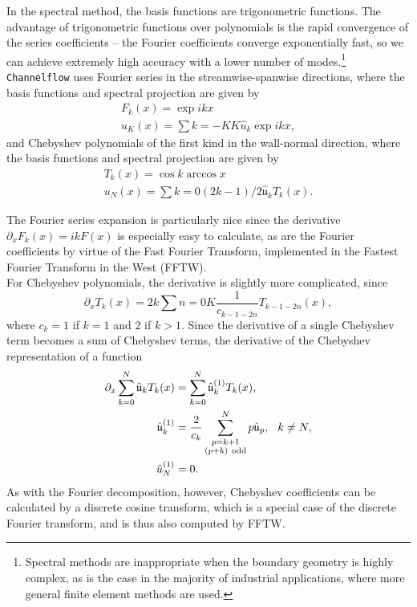 In the spectral method, the basis functions are trigonometric functions. The advantage of trigonometric functions over polynomials is the rapid convergence of the series coefficients -- the Fourier coefficients converge exponentially fast, so we can achieve extremely high accuracy with a lower number of modes.\footnote{Spectral methods are inappropriate when the boundary geometry is highly complex, as is the case in the majority of industrial applications, where more general finite element methods are used.} {\tt Channelflow} uses Fourier series in the streamwise-spanwise directions, where the basis functions and spectral projection are given by 
\begin{align}
F_k(x) = \exp{ikx}\\
u_K(x) = \sum{k=-K}{K}\hat{u}_k\exp{ikx},
\end{align}
and Chebyshev polynomials of the first kind in the wall-normal direction, where the basis functions and spectral projection are given by
\begin{align}
T_k(x) = \cos{k\arccos{x}}\\
u_N(x) = \sum{k=0}{(2k-1)/2}\hat{\mathfrak{u}}_kT_k(x).
\end{align}
\par The Fourier series expansion is particularly nice since the derivative $\partial_x F_k(x) = ikF(x)$ is especially easy to calculate, as are the Fourier coefficients by virtue of the Fast Fourier Transform, implemented in the Fastest Fourier Transform in the West (FFTW).\\

For Chebyshev polynomials, the derivative is slightly more complicated, since 
\begin{equation}
\partial_x T_k(x) = 2k\sum{n=0}{K}{\frac{1}{c_{k-1-2n}} T_{k-1-2n}(x)},
\end{equation}
where $c_k = 1$ if $k=1$ and $2$ if $k > 1$. Since the derivative of a single Chebyshev term becomes a sum of Chebyshev terms, the derivative of the Chebyshev representation of a function 
\begin{align}
\partial_x \sum{k=0}{N}\hat{\mathfrak{u}}_kT_k(x) &= \sum{k=0}{N}\hat{\mathfrak{u}}_k^{(1)}T_k(x),\\
\hat{\mathfrak{u}}_k^{(1)} &= \frac{2}{c_k}\sum{\substack{p = k+1\\(p+k) \mathrm{~odd}}}{N} p \hat{\mathfrak{u}}_p, \hspace{0.25cm} k \neq N,\\
\hat{u}^{(1)}_N &= 0.
\end{align}
As with the Fourier decomposition, however, Chebyshev coefficients can be calculated by a discrete cosine transform, which is a special case of the discrete Fourier transform, and is thus also computed by FFTW. 


